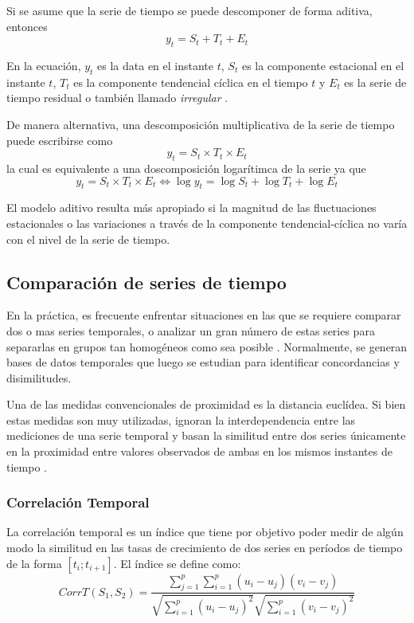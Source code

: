     Si se asume que la serie de tiempo se puede descomponer de forma aditiva, entonces
    \begin{equation}
        y_t = S_t + T_t + E_t
     \end{equation}
        
     En la ecuación,  $y_t$ es la data en el instante $t$, $S_t$ es la componente estacional en el instante $t$, $T_t$ es la componente tendencial cíclica en el tiempo $t$
     y $E_t$ es la serie de tiempo residual o también llamado \textit{irregular} \cite{20}.

     De manera alternativa, una descomposición multiplicativa de la serie de tiempo puede escribirse como
     \begin{equation}
        y_t = S_t 
        \times T_t 
        \times E_t
     \end{equation}
     la cual es equivalente a una doscomposición logarítimca de la serie ya que 
     \begin{equation*}
        y_t = S_t 
        \times T_t 
        \times E_t
        \iff
        \log y_t =  \log S_t +
        \log T_t +
        \log E_t
     \end{equation*}

     El modelo aditivo resulta más apropiado si la magnitud de las fluctuaciones estacionales o las variaciones
     a través de la componente tendencial-cíclica no varía con el nivel de la serie de tiempo.


     \subsection{Comparación de series de tiempo}
     En la práctica, es frecuente enfrentar situaciones
     en las que se requiere comparar dos o mas series temporales, o analizar un gran
     número de estas series para separarlas en grupos tan homogéneos como sea posible \cite{27}.
     Normalmente, se generan bases de datos temporales que luego se estudian para identificar concordancias y disimilitudes.    

     Una de las medidas convencionales de proximidad es la distancia euclídea. Si bien estas medidas son muy utilizadas, ignoran la interdependencia entre
     las mediciones de una serie temporal y basan la similitud entre dos series únicamente en la proximidad entre valores observados de ambas en los mismos instantes de
     tiempo \cite{27}.
     \subsubsection{Correlación Temporal}
     La correlación temporal es un índice que tiene por objetivo poder medir de algún modo la similitud en las tasas de crecimiento de dos series en períodos de
     tiempo de la forma $[t_i; t_{i+1}]$. El índice se define como:
     \begin{equation}\label{eqn:cort}
        CorrT(S_1,S_2) = \frac{\sum_{j=1}^p\sum_{i=1}^p(u_i-u_j)(v_i-v_j)} {\sqrt{\sum_{i=1}^p(u_i-u_j)^2}\sqrt{\sum_{i=1}^p(v_i-v_j)^2}}
     \end{equation}

